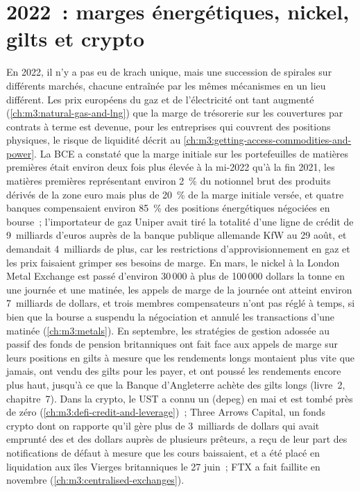 \section{2022~: marges énergétiques, nickel, gilts et crypto}

En 2022, il n'y a pas eu de krach unique, mais une succession de spirales sur différents marchés, chacune entraînée par les mêmes mécanismes en un lieu différent. Les prix européens du gaz et de l'électricité
ont tant augmenté (\cref{ch:m3:natural-gas-and-lng}) que la marge de trésorerie sur les couvertures par contrats à terme est devenue, pour les entreprises qui couvrent des positions physiques, le risque de liquidité
décrit au \cref{ch:m3:getting-access-commodities-and-power}. La BCE a constaté que la marge initiale sur les portefeuilles de matières premières était environ deux fois plus élevée à la mi-2022
qu'à la fin 2021, les matières premières représentant environ 2~\% du notionnel brut des produits dérivés de la zone euro mais plus de 20~\% de la marge initiale versée, et quatre banques
compensaient environ 85~\% des positions énergétiques négociées en bourse~; l'importateur de gaz Uniper avait tiré la totalité d'une ligne de crédit de 9~milliards d'euros auprès de la banque publique allemande
KfW au 29 août, et demandait 4~milliards de plus, car les restrictions d'approvisionnement en gaz et les prix faisaient grimper ses besoins de marge.
En mars, le nickel à la London Metal Exchange est passé d'environ 30\,000 à plus de 100\,000 dollars la tonne en une journée et une matinée, les appels de marge de la journée ont atteint
environ 7~milliards de dollars, et trois membres compensateurs n'ont pas réglé à temps, si bien que la bourse a suspendu la négociation et annulé les transactions d'une matinée
(\cref{ch:m3:metals}). En septembre, les stratégies de gestion adossée au passif des fonds de pension britanniques ont fait face aux appels de marge sur leurs positions en gilts à mesure que les rendements longs montaient
plus vite que jamais, ont vendu des gilts pour les payer, et ont poussé les rendements encore plus haut, jusqu'à ce que la Banque d'Angleterre achète des gilts longs (livre~2, chapitre~7). Dans la crypto, le
 UST a connu un  (depeg) en mai et est tombé près de zéro (\cref{ch:m3:defi-credit-and-leverage})~; Three Arrows Capital, un fonds crypto dont on rapporte qu'il gère plus de
3~milliards de dollars qui avait emprunté des  et des dollars auprès de plusieurs prêteurs, a reçu de leur part des notifications de défaut à mesure que les cours baissaient, et a été placé en liquidation
aux îles Vierges britanniques le 27 juin~; FTX a fait faillite en novembre
(\cref{ch:m3:centralised-exchanges}).

